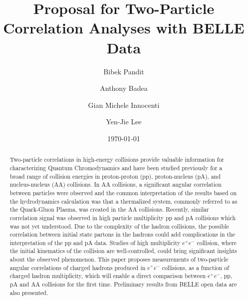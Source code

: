 \documentclass[%
preprint,
bibnotes,
]{revtex4-1}
\begin{document}

\title{Proposal for Two-Particle Correlation Analyses with BELLE Data}%

\author{Bibek Pandit}%
\author{Anthony Badea}%
\author{Gian Michele Innocenti}%
\author{Yen-Jie Lee}


\date{\today}%

\begin{abstract}
Two-particle correlations in high-energy collisions provide valuable information for characterizing Quantum Chromodynamics and have been studied previously for a broad range of collision energies in proton-proton (pp), proton-nucleus (pA), and nucleus-nucleus (AA) collisions. In AA collisions, a significant angular correlation between particles were observed and the common interpretation of the results based on the hydrodynamics calculation was that a thermalized system, commonly referred to as the Quark-Gluon Plasma, was created in the AA collisions. Recently, similar correlation signal was observed in high particle multiplicity pp and pA collisions which was not yet understood. Due to the complexity of the hadron collisions, the possible correlation between initial state partons in the hadrons could add complications in the interpretation of the pp and pA data. Studies of high multiplicity $e^+e^-$ collision, where the initial kinematics of the collision are well-controlled, could bring significant insights about the observed phenomenon. This paper proposes measurements of two-particle angular correlations of charged hadrons produced in $e^+e^-$ collisions, as a function of charged hadron multiplicity, which will enable a direct comparison between $e^+e^-$, pp, pA and AA collisions for the first time. Preliminary results from BELLE open data are also presented.
\end{abstract}

\maketitle











{}

\end{document}
